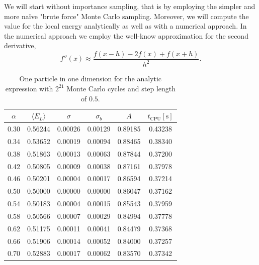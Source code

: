\documentclass[
    a4paper, aps, twocolumn, floatfix, superscriptaddress, nofootinbib]{revtex4-1}
\newcommand{\1}{\mathds{1}}
\begin{document}
    We will start without importance sampling, that is by employing the simpler and more naïve "brute force" Monte Carlo
    sampling. Moreover, we will compute the value for the local energy analytically as well as with a numerical approach.
    In the numerical approach we employ the well-know approximation for the second derivative,
    \begin{equation}
    		f''(x) \approx \frac{f(x-h) - 2f(x) + f(x+h)}{h^2}.
    \end{equation}

    \begin{table}
        \centering
        \caption{One particle in one dimension for the analytic expression with
        $2^{21}$ Monte Carlo cycles and step length of $0.5$.}
        \begin{ruledtabular}
            \begin{tabular}{cccccc}
                $\alpha$ & $\langle  E_L\rangle$ & $\sigma$ & $\sigma_b$ & $A$
                & $t_{\text{CPU}} [\si{\second}]$ \\
                \hline
                0.30&0.56244&0.00026&0.00129&0.89185&0.43238\\
                0.34&0.53652&0.00019&0.00094&0.88465&0.38340\\
                0.38&0.51863&0.00013&0.00063&0.87844&0.37200\\
                0.42&0.50805&0.00009&0.00038&0.87161&0.37978\\
                0.46&0.50201&0.00004&0.00017&0.86594&0.37214\\
                0.50&0.50000&0.00000&0.00000&0.86047&0.37162\\
                0.54&0.50183&0.00004&0.00015&0.85543&0.37959\\
                0.58&0.50566&0.00007&0.00029&0.84994&0.37778\\
                0.62&0.51175&0.00011&0.00041&0.84479&0.37368\\
                0.66&0.51906&0.00014&0.00052&0.84000&0.37257\\
                0.70&0.52883&0.00017&0.00062&0.83570&0.37342\\
            \end{tabular}
        \end{ruledtabular}
        \label{tab:1D1N_analytic}
    \end{table}
\end{document}
